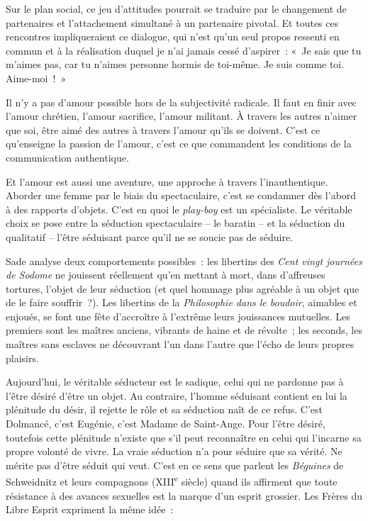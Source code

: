 \documentclass[french,twoside]{book} %
\newcommand{\astermono}{\medskip\centerline{\color{rubric}\large\selectfont{\syms ✻}}\medskip\par}%
\begin{document}
Sur le plan social, ce jeu d’attitudes pourrait se traduire par le changement de partenaires et l’attachement simultané à un partenaire pivotal. Et toutes ces rencontres impliqueraient ce dialogue, qui n’est qu’un seul propos ressenti en commun et à la réalisation duquel je n’ai jamais cessé d’aspirer : « Je sais que tu m’aimes pas, car tu n’aimes personne hormis de toi-même. Je suis comme toi. Aime-moi ! »\par
Il n’y a pas d’amour possible hors de la subjectivité radicale. Il faut en finir avec l’amour chrétien, l’amour sacrifice, l’amour militant. À travers les autres n’aimer que soi, être aimé des autres à travers l’amour qu’ils se doivent. C’est ce qu’enseigne la passion de l’amour, c’est ce que commandent les conditions de la communication authentique.\par

\astermono

\noindent Et l’amour est aussi une aventure, une approche à travers l’inauthentique. Aborder une femme par le biais du spectaculaire, c’est se condamner dès l’abord à des rapports d’objets. C’est en quoi le \emph{play-boy} est un spécialiste. Le véritable choix se pose entre la séduction spectaculaire – le baratin – et la séduction du qualitatif – l’être séduisant parce qu’il ne se soucie pas de séduire.\par
Sade analyse deux comportements possibles : les libertins des \emph{Cent vingt journées de Sodome} ne jouissent réellement qu’en mettant à mort, dans d’affreuses tortures, l’objet de leur séduction (et quel hommage plus agréable à un objet que de le faire souffrir ?). Les libertins de la \emph{Philosophie dans le boudoir}, aimables et enjoués, se font une fête d’accroître à l’extrême leurs jouissances mutuelles. Les premiers sont les maîtres anciens, vibrants de haine et de révolte ; les seconds, les maîtres sans esclaves ne découvrant l’un dans l’autre que l’écho de leurs propres plaisirs.\par
Aujourd’hui, le véritable séducteur est le sadique, celui qui ne pardonne pas à l’être désiré d’être un objet. Au contraire, l’homme séduisant contient en lui la plénitude du désir, il rejette le rôle et sa séduction naît de ce refus. C’est Dolmancé, c’est Eugénie, c’est Madame de Saint-Ange. Pour l’être désiré, toutefois cette plénitude n’existe que s’il peut reconnaître en celui qui l’incarne sa propre volonté de vivre. La vraie séduction n’a pour séduire que sa vérité. Ne mérite pas d’être séduit qui veut. C’est en ce sens que parlent les \emph{Béguines} de Schweidnitz et leurs compagnons (XIII\textsuperscript{e} siècle) quand ils affirment que toute résistance à des avances sexuelles est la marque d’un esprit grossier. Les Frères du Libre Esprit expriment la même idée :\par
\end{document}
